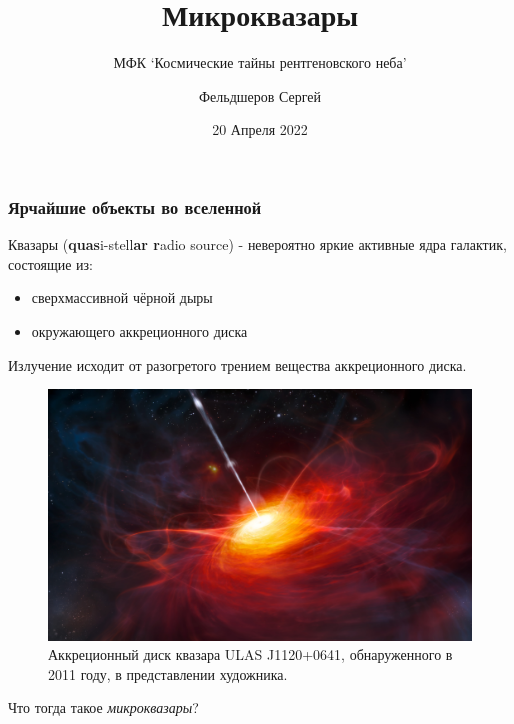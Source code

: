 \documentclass{beamer}
\title{Микроквазары}
\subtitle{МФК `Космические тайны рентгеновского неба'}
\author{Фельдшеров Сергей}
\date{20 Апреля 2022}
\begin{document}

\begin{frame}
	\titlepage
\end{frame}

\begin{frame}
	\frametitle{Ярчайшие объекты во вселенной}
	Квазары (\textbf{quas}i-stell\textbf{ar r}adio source) - невероятно яркие активные ядра
	галактик, состоящие из:
	\begin{itemize}
		\item сверхмассивной чёрной дыры
		\item окружающего аккреционного диска
	\end{itemize}
	Излучение исходит от разогретого трением вещества аккреционного диска.
	\begin{figure}[h]
		\includegraphics[width=.5\textwidth]{resources/quasar-rendering.jpg}
		\caption{Аккреционный диск квазара ULAS J1120+0641, обнаруженного в 2011 году, в представлении художника.}
	\end{figure}
	Что тогда такое \emph{микроквазары}?

\end{frame}
\end{document}
